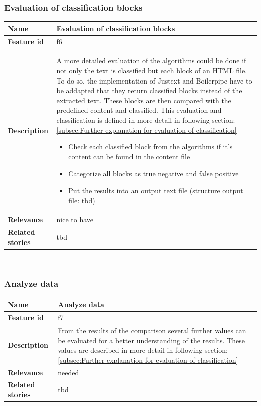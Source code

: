 \subsubsection{Evaluation of classification blocks}

	\begin{tabular}{ | p{3cm} | p{12cm} |}
	\hline
	\textbf{Name} 				& Evaluation of classification blocks \\ \hline
	\textbf{Feature id} 		& f6 \\ \hline
	\textbf{Description} 		& A more detailed evaluation of the algorithms could be done if not only the text is classified but each block of an HTML file. To do so, the implementation of Justext and Boilerpipe have to be addapted that they return classified blocks instead of the extracted text. These blocks are then compared with the predefined content and classified. This evaluation and classification is defined in more detail in following section: \ref{subsec:Further explanation for evaluation of classification}
								\begin{itemize}
							        \item Check each classified block from the algorithms if it's content can be found in the content file
							        \item Categorize all blocks as true negative and false positive
							        \item Put the results into an output text file (structure output file: tbd)
						        \end{itemize} \\ \hline
	\textbf{Relevance} 			& nice to have\\ \hline
	\textbf{Related stories} 	& tbd \\ \hline
	\end{tabular} \\





\subsubsection{Analyze data}

	\begin{tabular}{ | p{3cm} | p{12cm} |}
	\hline
	\textbf{Name} 				& Analyze data \\ \hline
	\textbf{Feature id} 		& f7 \\ \hline
	\textbf{Description} 		&  From the results of the comparison several further values can be evaluated for a better understanding of the results. These values are described in more detail in following section: \ref{subsec:Further explanation for evaluation of classification}
								    \\ \hline
	\textbf{Relevance} 			& needed \\ \hline
	\textbf{Related stories} 	& tbd \\ \hline
	\end{tabular} \\

